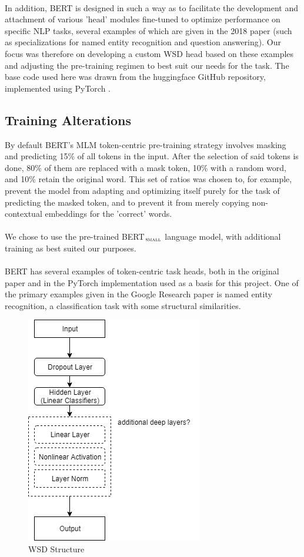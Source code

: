 \documentclass{IEEEtran}
\begin{document}
	\\
	In addition, BERT is designed in such a way as to facilitate the development and attachment of various 'head' modules fine-tuned to optimize performance on specific NLP tasks, several examples of which are given in the 2018 paper (such as specializations for named entity recognition and question answering). Our focus was therefore on developing a custom WSD head based on these examples and adjusting the pre-training regimen to best suit our needs for the task. The base code used here was drawn from the huggingface GitHub repository, implemented using PyTorch \cite{pytorch-bert}.
	
\subsection{Training Alterations}
	By default BERT's MLM token-centric pre-training strategy involves masking and predicting 15\% of all tokens in the input. After the selection of said tokens is done, 80\% of them are replaced with a mask token, 10\% with a random word, and 10\% retain the original word. This set of ratios was chosen to, for example, prevent the model from adapting and optimizing itself purely for the task of predicting the masked token, and to prevent it from merely copying non-contextual embeddings for the 'correct' words.
	\\ \\
	We chose to use the pre-trained BERT$_{\textsc{small}}$ language model, with additional training as best suited our purposes.
	\\ \\
	BERT has several examples of token-centric task heads, both in the original paper and in the PyTorch implementation used as a basis for this project. One of the primary examples given in the Google Research paper is named entity recognition, a classification task with some structural similarities.
	\begin{figure}[h]
		\centering
		\includegraphics[scale=0.4]{layers.png}
		\caption{WSD Structure}
		\label{figure:wsdhead}
	\end{figure}
\end{document}
